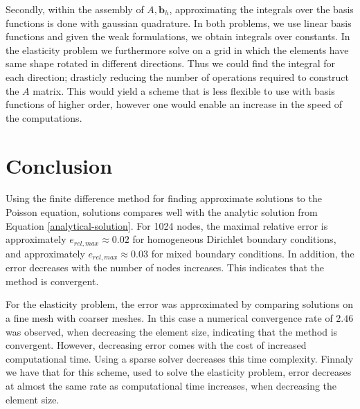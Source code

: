 \documentclass[5pt,a4paper,english]{elsarticle}%
\begin{document}
Secondly, within the assembly of $A,\bm b_h$, approximating the integrals over the basis functions is done with gaussian quadrature. In both problems, we use linear basis functions and given the weak formulations, we obtain integrals over constants. In the elasticity problem we furthermore solve on a grid in which the elements have same shape rotated in different directions. Thus we could find the integral for each direction; drasticly reducing the number of operations required to construct the $A$ matrix. This would yield a scheme that is less flexible to use with basis functions of higher order, however one would enable an increase in the speed of the computations. 
   
\section{Conclusion}
Using the finite difference method for finding approximate solutions to the Poisson equation, solutions compares well with the analytic solution from Equation \eqref{analytical-solution}. For 1024 nodes, the maximal relative error is approximately $e_{rel,max} \approx 0.02$ for homogeneous Dirichlet boundary conditions, and approximately $e_{rel,max} \approx 0.03$ for mixed boundary conditions. In addition, the error decreases with the number of nodes increases. This indicates that the method is convergent.

For the elasticity problem, the error was approximated by comparing solutions on a fine mesh with coarser meshes. In this case a numerical convergence rate of $2.46$ was observed, when decreasing the element size, indicating that the method is convergent. However, decreasing error comes with the cost of increased computational time. Using a sparse solver decreases this time complexity. Finnaly we have that for this scheme, used to solve the elasticity problem, error decreases at almost the same rate as computational time increases, when decreasing the element size.
	


\end{document}
